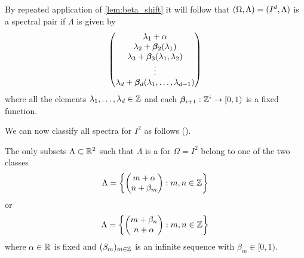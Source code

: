 \documentclass[../thesis.tex]{subfiles}
\begin{document}
\begin{example}\label{ex:cannot_class_all}
    By repeated application of \cref{lem:beta_shift} it will follow that $(\Omega,\Lambda)= (I^d, \Lambda)$ is a spectral pair if $\Lambda$ is given by %
    \begin{equation}\label{eq:cannot_class_all}
        \begin{pmatrix}
            \lambda_1 +\alpha\\
            \lambda_2+\bm{\beta}_2(\lambda_1)\\
            \lambda_3+\bm{\beta}_3(\lambda_1,\lambda_2)\\
            \vdots\\
            \lambda_d+\bm{\beta}_d(\lambda_1,\dots,\lambda_{d-1})\\
        \end{pmatrix}
    \end{equation}
    where all the elements $\lambda_1, \dots, \lambda_d \in \mathbb{Z}$ and each $\bm{\beta}_{i+1}:\mathbb{Z}^{i} \rightarrow [0,1)$ is a fixed function.
\end{example}
We can now classify all spectra for $I^2$ as follows (\cite{jorgensenSpectralPairsCartesian2001}). 
\begin{theorem}\label{thrm:class_all_shift_2d}
    The only subsets $\Lambda \subset \mathbb{R}^2$ such that $\Lambda$ is a for $\Omega = I^2$ belong to one of the two classes
    \begin{equation}\label{eq:2d_all_shift_class_1}
        \Lambda = \left\{
            \begin{pmatrix}
            m + \alpha \\
            n + \beta_m
            \end{pmatrix} : m,n \in  \mathbb{Z}
            \right\}
    \end{equation}
    or
    \begin{equation}\label{eq:2d_all_shift_class_2}
        \Lambda = \left\{
            \begin{pmatrix}
            m + \beta_n\\
            n + \alpha
            \end{pmatrix} : m,n \in  \mathbb{Z}
            \right\}
    \end{equation}
    where $\alpha \in \mathbb{R}$ is fixed and $(\beta_m)_{m\in \mathbb{Z}}$ is an infinite sequence with $\beta_m \in [0,1)$.
\end{theorem}
\end{document}
